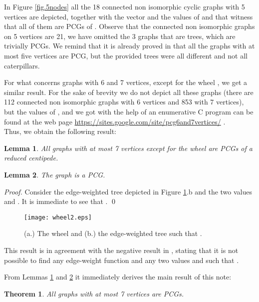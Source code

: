 \documentclass[review]{elsarticle}
\newtheorem{theorem}{Theorem}
\newtheorem{lemma}{Lemma}
\begin{document}
In Figure \ref{fig.5nodes} all the 18 connected non isomorphic cyclic graphs with 5 vertices are depicted, together with the vector  and the values of  and  that witness that all of them are PCGs of .  Observe that the connected non isomorphic graphs on 5 vertices are 21, we have omitted the 3 graphs that are trees, which are trivially PCGs.
We remind that it is already proved in \cite{P02} that all the graphs with at most five vertices are PCG, but the provided trees were all different and not all caterpillars.

\medskip

For what concerns graphs with 6 and 7 vertices, except for the wheel , we get a similar result. 
For the sake of brevity we do not depict all these graphs (there are 112 connected non isomorphic graphs with 6 vertices and 853 with 7 vertices), but the values of ,  and  we got with the help of an enumerative C program can be found at the web page \url{https://sites.google.com/site/pcg6and7vertices/} .\\
Thus, we obtain the following result:

\begin{lemma}
\label{lemma:567}
All graphs with at most 7 vertices except for the wheel  are PCGs of a reduced centipede.
\end{lemma}


\begin{lemma}
\label{lemma:wheel}
The graph  is a PCG.
\end{lemma}
\begin{proof}
Consider the edge-weighted tree  depicted in Figure \ref{fig.wheel}.b and the two values  and .
It is immediate to see that . \qed
\end{proof}

\begin{figure}[!ht]
\centering
\texttt{[image: wheel2.eps]}
\caption{(a.) The wheel  and (b.) the edge-weighted tree  such that .} 
\label{fig.wheel}
\end{figure}

This result is in agreement with the negative result in \cite{CFS}, stating that it is not possible to find any edge-weight function  and any two values  and  such that .

\medskip

From Lemmas \ref{lemma:567} and \ref{lemma:wheel} it immediately derives the main result of this note:

\begin{theorem}
All graphs with at most 7 vertices are PCGs.
\end{theorem}
\end{document}

